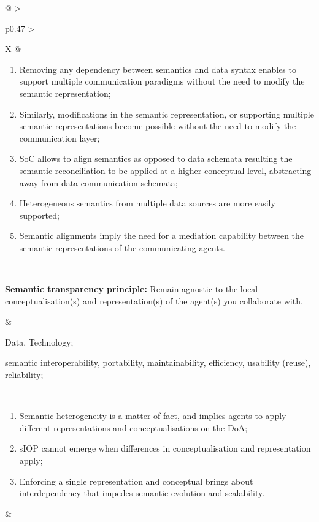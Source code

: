 \begin{xltabular}[l]{\linewidth}{@{} >{\small\raggedright\arraybackslash}p{0.47\linewidth} >{\small\raggedright\arraybackslash}X @{}}
\begin{enumerate}[left=10pt, nosep]
  \item Removing any dependency between semantics and data syntax enables to support multiple communication paradigms without the need to modify the semantic representation;
  \item Similarly, modifications in the semantic representation, or supporting multiple semantic representations become possible without the need to modify the communication layer;
  \item SoC allows to align semantics as opposed to data schemata resulting the semantic reconciliation to be applied at a higher conceptual level, abstracting away from data communication schemata;
  \item Heterogeneous semantics from multiple data sources are more easily supported;
  \item Semantic alignments imply the need for a mediation capability between the semantic representations of the communicating agents.
\end{enumerate} \\
%
%
%
\begin{mmdp}\label{dp:st}{\bfseries Semantic transparency principle:}
\quad Remain agnostic to the local conceptualisation(s) and representation(s) of the agent(s) you collaborate with. \end{mmdp}
&
\begin{description}[labelwidth=3.7cm,leftmargin=3.7cm+1ex,nosep,topsep=2ex,labelsep=1ex,font=\bfseries]
\item[Type of information:] Data, Technology;
\item[Quality attributes:] semantic interoperability, portability, maintainability, efficiency, usability (reuse), reliability;
\end{description}
\\
\begin{enumerate}[left=6pt, nosep]
  \item Semantic heterogeneity is a matter of fact, and implies agents to apply different representations and conceptualisations on the DoA;
  \item sIOP cannot emerge when differences in conceptualisation and representation apply;
  \item Enforcing a single representation and conceptual brings about interdependency that impedes semantic evolution and scalability.
\end{enumerate}
&
\begin{enumerate}[left=10pt, nosep]

\end{enumerate}
\end{xltabular}
